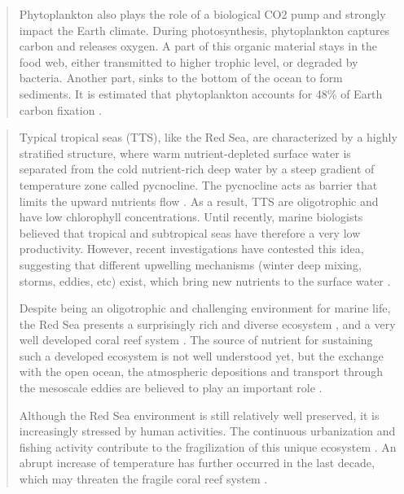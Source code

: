 \begin{quotation}
Phytoplankton also plays the role of a biological CO2 pump and strongly impact
the Earth climate. During photosynthesis, phytoplankton captures carbon and
releases oxygen. A part of this organic material stays in the food web, either
transmitted to higher trophic level, or degraded  by bacteria. Another part,
sinks to the bottom of the ocean to form sediments. It is estimated that
phytoplankton accounts for 48\% of Earth carbon fixation \citep{Pal2014}.

\end{quotation}

\begin{quotation} 

Typical tropical seas (TTS), like the Red Sea, are
characterized by a highly stratified structure, where warm nutrient-depleted
surface water is separated from the cold nutrient-rich deep water by a steep
gradient of temperature zone called pycnocline. The pycnocline acts as barrier
that limits the upward nutrients flow \citep{Mann2006}. As a result, TTS are
oligotrophic and have low chlorophyll concentrations. Until recently, marine
biologists believed that tropical and subtropical seas have therefore a very
low productivity. However, recent investigations have contested this idea,
suggesting that different upwelling mechanisms (winter deep mixing, storms,
eddies, etc) exist, which bring new nutrients to the surface water
\citep{Mann2006}.

Despite being an oligotrophic and challenging environment for marine life, the
Red Sea presents a surprisingly rich and diverse ecosystem \citep{Raitsos2011},
and a very well developed coral reef system \citep{Racault}. The source of
nutrient for sustaining such a developed ecosystem is not well understood yet,
but the exchange with the open ocean, the atmospheric depositions and transport
through the mesoscale eddies are believed to play an important role
\citep{Raitsos2013, Zhan2014}.

Although the Red Sea environment is still relatively well preserved, it is
increasingly stressed by human activities. The continuous urbanization and
fishing activity contribute to the fragilization of this unique ecosystem
\citep{Acker2008}. An abrupt increase of temperature has further occurred in
the last decade, which may threaten the fragile coral reef system
\citep{Raitsos2011}.


\end{quotation}
